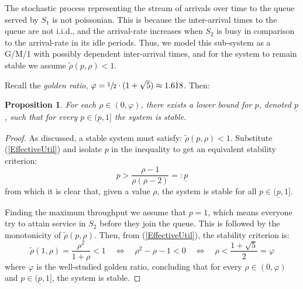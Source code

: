 \documentclass[11pt]{article}
\numberwithin{equation}{section}
\newtheorem{proposition}{Proposition}[section]
\begin{document}
The stochastic process representing the stream of arrivals over time to the queue served by $S_{1}$ is not poissonian. This is because the inter-arrival times to the queue are not i.i.d., and the arrival-rate increases when $S_2$ is busy in comparison to the arrival-rate in its idle periods. Thus, we model this sub-system as a G/M/1 with possibly dependent inter-arrival times, and for the system to remain stable we assume $\tilde{\rho}(p,\rho) < 1$.

Recall the {\it golden ratio}, $\varphi = \sfrac{1}{2} \cdot (1+\sqrt{5})\approx 1.618$. Then:

\begin{proposition}
For each $\rho\in(0,\varphi)$, there exists a lower bound for $p$, denoted $\underline{p}$, such that for every $p \in (\underline{p}, 1]$ the system is stable.
\end{proposition}

\begin{proof}
As discussed, a stable system must satisfy: $\tilde{\rho}(p,\rho) < 1$. Substitute (\ref{EffectiveUtil}) and isolate $p$ in the inequality to get an equivalent stability criterion:
\[ p > \frac{\rho - 1}{\rho(\rho-2)} =: \underline{p}\]
from which it is clear that, given a value $\rho$, the system is stable for all $p \in (\underline{p},1]$.

Finding the maximum throughput we assume that $p=1$, which means everyone try to attain service in $S_{2}$ before they join the queue. This is followed by the monotonicity of $\tilde{\rho}(p,\rho)$. Then, from (\ref{EffectiveUtil}), the stability criterion is:
\[ \tilde{\rho}(1,\rho)=\frac{\rho^2}{1+\rho}<1 \quad\Leftrightarrow\quad \rho^2-\rho-1<0 \quad\Leftrightarrow\quad \rho < \frac{1+\sqrt{5}}{2}=\varphi \]
where $\varphi$ is the well-studied golden ratio, concluding that for every $\rho\in(0,\varphi)$ and $p \in (\underline{p},1]$, the system is stable.
\end{proof}

\newpage
\end{document}
